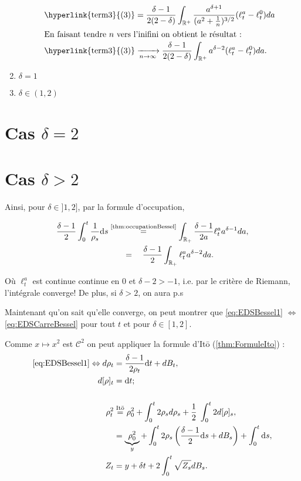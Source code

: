 \documentclass[openany]{book}
\makeatletter
\newcommand{\R}{\mathbb{R}}
\newcommand{\1}{\mathbbm{1}}
\renewcommand{\d}{\mathrm{d}}
\renewenvironment{proof}[1][\textbf{\textit{Démonstration}}]{%
  \par\pushQED{\qed}%
  \normalfont\topsep6\p@\@plus6\p@\relax
  \trivlist\item[\hskip\labelsep
    #1\@addpunct{.}]\ignorespaces
}{%
  \popQED\endtrivlist\@endpefalse
}
\theoremstyle{thmfont}
\theoremstyle{deffont}
\theoremstyle{thmfont}
\theoremstyle{deffont}
\makeatother
\begin{document}
\begin{proof}
\begin{enumerate}
    \begin{align*}
      \text{\hyperlink{term3}{(3)}} &= \dfrac{\delta -1}{2(2-\delta)} \int_{\R^+} \dfrac{a^{\delta+1}}{(a^2 + \frac{1}{n})^{3/2}}(\ell_t^a - \ell_t^0) da\\
      \intertext{En faisant tendre $n$ vers l'inifini on obtient le résultat :}
     \text{\hyperlink{term3}{(3)}} &\xrightarrow[n \to \infty]{} \dfrac{\delta -1}{2(2-\delta)} \int_{\R^+} a^{\delta-2}(\ell_t^a - \ell_t^0) da.
    \end{align*}
    
  \item{$\delta = 1$}
  \item{$\delta \in (1,2)$}
  \end{enumerate}
\end{proof}

\section{Cas $\delta = 2 $}
\section{Cas $\delta > 2 $}

\newpage    
Ainsi, pour $\delta \in ]1,2]$, par la formule d'occupation, 

\begin{align*}
  \dfrac{\delta-1}{2}\int_0^t \dfrac{1}{\rho_s} \d s &\overset{\text{\autoref{thm:occupationBessel}}}{=} \int_{\R_+} \dfrac{\delta-1}{2 a} \ell_t^a a^{\delta-1} da,\\
  &\quad\;\;\;=\quad \dfrac{\delta-1}{2} \int_{\R_+} \ell_t^a a^{\delta-2} da.
\end{align*}

Où $\ell_t^a$ est continue continue en $0$ et $\delta-2 >-1$, i.e. par le critère de Riemann, l'intégrale converge! De plus, si $\delta > 2$, on aura p.s

Maintenant qu'on sait qu'elle converge, on peut montrer que \eqref{eq:EDSBessel1} $\Leftrightarrow$ \eqref{eq:EDSCarreBessel} pour tout $t$ et pour $\delta \in [1,2]$.

  Comme $x \mapsto x^2$ est $\mathcal C^2$ on peut appliquer la formule d'Itō (\autoref{thm:FormuleIto}) :
\begin{alignat*}{1}
  \eqref{eq:EDSBessel1} \Leftrightarrow d\rho_t
  &= \dfrac{\delta -1}{2\rho_t}\d t + dB_t,\\
  d[\rho]_t &= \d t;\\\\
  \rho_t^2 &\overset{\text{Itō}}{=} \rho_0^2 + \int_0^t 2\rho_s d\rho_s + \dfrac{1}{2}\;\int_0^t2 d[\rho]_s,\\
  &= \underbrace{\rho_0^2}_y + \int_0^t2 \rho_s \left(\dfrac{\delta -1}{2}\d s + dB_s\right) +\int_0^t \d s,\\
  Z_t &= y + \delta t + 2\int_0^t \sqrt{Z_s} dB_s.
\end{alignat*}
\end{document}

